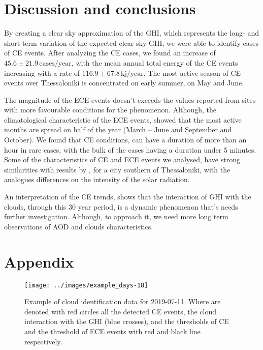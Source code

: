 \documentclass[preprint, 5p,
authoryear]{elsarticle} %
\begin{document}
\hypertarget{discussion-and-conclusions}{%
\section{Discussion and conclusions}\label{discussion-and-conclusions}}

By creating a clear sky approximation of the GHI, which represents the
long- and short-term variation of the expected clear sky GHI, we were
able to identify cases of CE events. After analyzing the CE cases, we
found an increase of \(45.6\pm 21.9\,\text{cases}/\text{year}\), with
the mean annual total energy of the CE events increasing with a rate of
\(116.9\pm 67.8\,\text{kj}/\text{year}\). The most active season of CE
events over Thessaloniki is concentrated on early summer, on May and
June.

The magnitude of the ECE events doesn't exceeds the values reported from
sites with more favourable conditions for the phenomenon. Although, the
climatological characteristic of the ECE events, showed that the most
active months are spread on half of the year (March -- June and
September and October). We found that CE conditions, can have a duration
of more than an hour in rare cases, with the bulk of the cases having a
duration under 5 minutes. Some of the characteristics of CE and ECE
events we analysed, have strong similarities with results by
\citet{Vamvakas2020}, for a city southern of Thessaloniki, with the
analogues differences on the intensity of the solar radiation.

An interpretation of the CE trends, shows that the interaction of GHI
with the clouds, through this 30 year period, is a dynamic phenomenon
that's needs further investigation. Although, to approach it, we need
more long term observations of AOD and clouds characteristics.

\hypertarget{appendix}{%
\section*{Appendix}\label{appendix}}

\begin{figure}[H]

{\centering \texttt{[image: ../images/example\_days-18]} 

}

\caption{Example of cloud identification data for 2019-07-11. Where are denoted with red circles all the detected CE events, the cloud interaction with the GHI (blue crosses), and the thresholds of CE and the threshold of ECE events with red and black line respectively.}\label{fig:example-day}
\end{figure}
\end{document}
